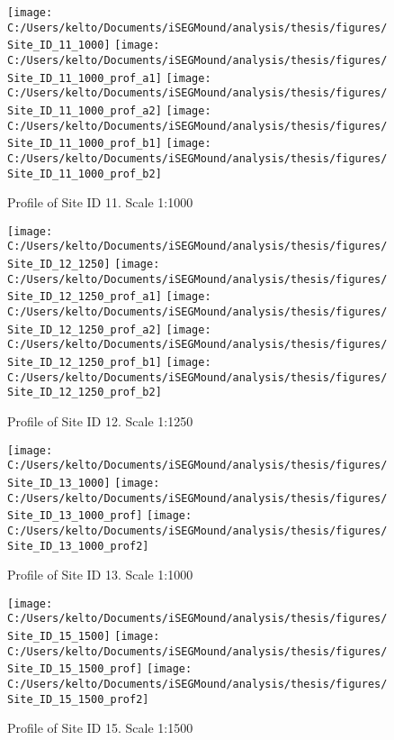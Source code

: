 \documentclass[
  12pt,
]{article}
\begin{document}
\begin{figure}
\texttt{[image: C:/Users/kelto/Documents/iSEGMound/analysis/thesis/figures/Site\_ID\_11\_1000]} \texttt{[image: C:/Users/kelto/Documents/iSEGMound/analysis/thesis/figures/Site\_ID\_11\_1000\_prof\_a1]} \texttt{[image: C:/Users/kelto/Documents/iSEGMound/analysis/thesis/figures/Site\_ID\_11\_1000\_prof\_a2]} \texttt{[image: C:/Users/kelto/Documents/iSEGMound/analysis/thesis/figures/Site\_ID\_11\_1000\_prof\_b1]} \texttt{[image: C:/Users/kelto/Documents/iSEGMound/analysis/thesis/figures/Site\_ID\_11\_1000\_prof\_b2]} \caption{Profile of Site ID 11. Scale 1:1000}\label{fig:FigureAOI4-11}
\end{figure}

\begin{figure}
\texttt{[image: C:/Users/kelto/Documents/iSEGMound/analysis/thesis/figures/Site\_ID\_12\_1250]} \texttt{[image: C:/Users/kelto/Documents/iSEGMound/analysis/thesis/figures/Site\_ID\_12\_1250\_prof\_a1]} \texttt{[image: C:/Users/kelto/Documents/iSEGMound/analysis/thesis/figures/Site\_ID\_12\_1250\_prof\_a2]} \texttt{[image: C:/Users/kelto/Documents/iSEGMound/analysis/thesis/figures/Site\_ID\_12\_1250\_prof\_b1]} \texttt{[image: C:/Users/kelto/Documents/iSEGMound/analysis/thesis/figures/Site\_ID\_12\_1250\_prof\_b2]} \caption{Profile of Site ID 12. Scale 1:1250}\label{fig:FigureAOI4-12}
\end{figure}

\begin{figure}
\texttt{[image: C:/Users/kelto/Documents/iSEGMound/analysis/thesis/figures/Site\_ID\_13\_1000]} \texttt{[image: C:/Users/kelto/Documents/iSEGMound/analysis/thesis/figures/Site\_ID\_13\_1000\_prof]} \texttt{[image: C:/Users/kelto/Documents/iSEGMound/analysis/thesis/figures/Site\_ID\_13\_1000\_prof2]} \caption{Profile of Site ID 13. Scale 1:1000}\label{fig:FigureAOI4-13}
\end{figure}

\begin{figure}
\texttt{[image: C:/Users/kelto/Documents/iSEGMound/analysis/thesis/figures/Site\_ID\_15\_1500]} \texttt{[image: C:/Users/kelto/Documents/iSEGMound/analysis/thesis/figures/Site\_ID\_15\_1500\_prof]} \texttt{[image: C:/Users/kelto/Documents/iSEGMound/analysis/thesis/figures/Site\_ID\_15\_1500\_prof2]} \caption{Profile of Site ID 15. Scale 1:1500}\label{fig:FigureAOI4-15}
\end{figure}
\end{document}
